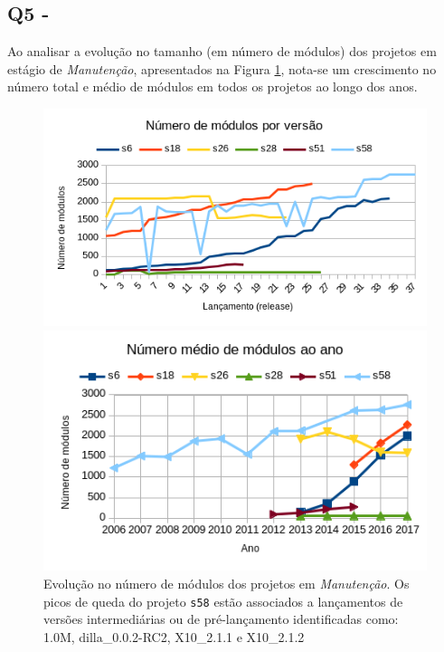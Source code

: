 \subsection{Q5 - \QuestaoCinco} %

Ao analisar a evolução no tamanho (em número de módulos) 
dos projetos em estágio de {\it Manutenção}, apresentados na Figura \ref{modules-evolution-servicing},
nota-se um crescimento no número total e médio de módulos
em todos os projetos ao longo dos anos.

\begin{figure}[ht]
  \center
  \includegraphics[scale=0.8]{imagens/modules-evolution-servicing.png}

  \includegraphics[scale=0.8]{imagens/modules-evolution-average.png}
  \caption{Evolução no número de módulos dos projetos em \textit{Manutenção}.
           Os picos de queda do projeto \texttt{s58} estão associados a lançamentos
           de versões intermediárias ou de pré-lançamento identificadas como:
           1.0M, dilla\_0.0.2-RC2, X10\_2.1.1 e X10\_2.1.2}
  \label{modules-evolution-servicing}
\end{figure}

